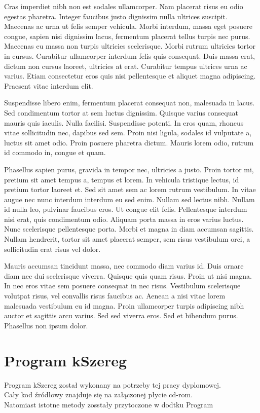 \documentclass[twoside]{pracaInzynierskaMS}
\begin{document}
 Cras imperdiet nibh non est sodales ullamcorper. Nam placerat risus eu odio egestas pharetra. Integer faucibus justo dignissim nulla ultrices suscipit. Maecenas ac urna ut felis semper vehicula. Morbi interdum, massa eget posuere congue, sapien nisi dignissim lacus, fermentum placerat tellus turpis nec purus. Maecenas eu massa non turpis ultricies scelerisque. Morbi rutrum ultricies tortor in cursus. Curabitur ullamcorper interdum felis quis consequat. Duis massa erat, dictum non cursus laoreet, ultricies at erat. Curabitur tempus ultrices urna ac varius. Etiam consectetur eros quis nisi pellentesque et aliquet magna adipiscing. Praesent vitae interdum elit. 

 Suspendisse libero enim, fermentum placerat consequat non, malesuada in lacus. Sed condimentum tortor at sem luctus dignissim. Quisque varius consequat mauris quis iaculis. Nulla facilisi. Suspendisse potenti. In eros quam, rhoncus vitae sollicitudin nec, dapibus sed sem. Proin nisi ligula, sodales id vulputate a, luctus sit amet odio. Proin posuere pharetra dictum. Mauris lorem odio, rutrum id commodo in, congue et quam. 

 Phasellus sapien purus, gravida in tempor nec, ultricies a justo. Proin tortor mi, pretium sit amet tempus a, tempus et lorem. In vehicula tristique lectus, id pretium tortor laoreet et. Sed sit amet sem ac lorem rutrum vestibulum. In vitae augue nec nunc interdum interdum eu sed enim. Nullam sed lectus nibh. Nullam id nulla leo, pulvinar faucibus eros. Ut congue elit felis. Pellentesque interdum nisi erat, quis condimentum odio. Aliquam porta massa in eros varius luctus. Nunc scelerisque pellentesque porta. Morbi et magna in diam accumsan sagittis. Nullam hendrerit, tortor sit amet placerat semper, sem risus vestibulum orci, a sollicitudin erat risus vel dolor. 

 Mauris accumsan tincidunt massa, nec commodo diam varius id. Duis ornare diam nec dui scelerisque viverra. Quisque quis quam risus. Proin ut nisi magna. In nec eros vitae sem posuere consequat in nec risus. Vestibulum scelerisque volutpat risus, vel convallis risus faucibus ac. Aenean a nisi vitae lorem malesuada vestibulum eu id magna. Proin ullamcorper turpis adipiscing nibh auctor et sagittis arcu varius. Sed sed viverra eros. Sed et bibendum purus. Phasellus non ipsum dolor.
       
\section    {Program kSzereg}
Program kSzereg został wykonany na potrzeby tej pracy dyplomowej.\\
Cały kod źródłowy znajduje się na załączonej płycie cd-rom. \\
Natomiast istotne metody  zosstały przytoczone w dodtku Program
\end{document}

